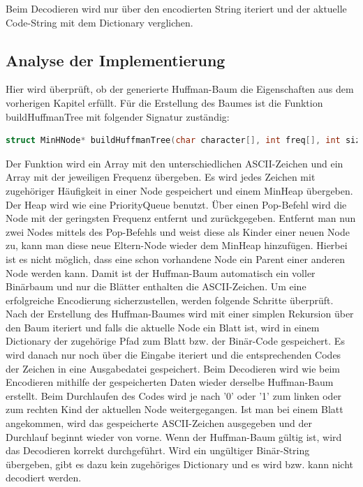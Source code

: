 \documentclass[course=erap]{aspdoc}
\begin{document}
Beim Decodieren wird nur über den encodierten String iteriert und der aktuelle Code-String mit dem Dictionary verglichen.

\subsection{Analyse der Implementierung}
Hier wird überprüft, ob der generierte Huffman-Baum die Eigenschaften aus dem vorherigen Kapitel erfüllt. Für die Erstellung des Baumes ist die Funktion buildHuffmanTree mit folgender Signatur zuständig: \begin{lstlisting}[language=c, numbers=none, frame=none]
    struct MinHNode* buildHuffmanTree(char character[], int freq[], int size)
\end{lstlisting}
Der Funktion wird ein Array mit den unterschiedlichen ASCII-Zeichen und ein Array mit der jeweiligen Frequenz übergeben. Es wird jedes Zeichen mit zugehöriger Häufigkeit in einer Node gespeichert und einem MinHeap übergeben. Der Heap wird wie eine PriorityQueue benutzt. Über einen Pop-Befehl wird die Node mit der geringsten Frequenz entfernt und zurückgegeben. Entfernt man nun zwei Nodes mittels des Pop-Befehls und weist diese als Kinder einer neuen Node zu, kann man diese neue Eltern-Node wieder dem MinHeap hinzufügen. Hierbei ist es nicht möglich, dass eine schon vorhandene Node ein Parent einer anderen Node werden kann. Damit ist der Huffman-Baum automatisch ein voller Binärbaum und nur die Blätter enthalten die ASCII-Zeichen.
\newline
Um eine erfolgreiche Encodierung sicherzustellen, werden folgende Schritte überprüft. Nach der Erstellung des Huffman-Baumes wird mit einer simplen Rekursion über den Baum iteriert und falls die aktuelle Node ein Blatt ist, wird in einem Dictionary der zugehörige Pfad zum Blatt bzw. der Binär-Code gespeichert. Es wird danach nur noch über die Eingabe iteriert und die entsprechenden Codes der Zeichen in eine Ausgabedatei gespeichert.
\newline
Beim Decodieren wird wie beim Encodieren mithilfe der gespeicherten Daten wieder derselbe Huffman-Baum erstellt. Beim Durchlaufen des Codes wird je nach '0' oder '1' zum linken oder zum rechten Kind der aktuellen Node weitergegangen. Ist man bei einem Blatt angekommen, wird das gespeicherte ASCII-Zeichen ausgegeben und der Durchlauf beginnt wieder von vorne. Wenn der Huffman-Baum gültig ist, wird das Decodieren korrekt durchgeführt. Wird ein ungültiger Binär-String übergeben, gibt es dazu kein zugehöriges Dictionary und es wird bzw. kann nicht decodiert werden.
\end{document}
